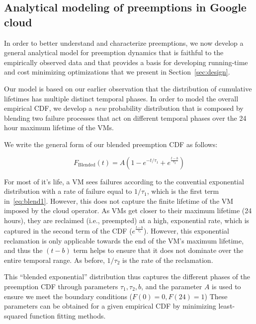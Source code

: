 \subsection{Analytical modeling of preemptions in Google cloud}

In order to better understand and characterize preemptions, we now develop a general analytical model for preemption dynamics that is faithful to the empirically observed data and that provides a basis for developing running-time and cost minimizing optimizations that we present in Section~\ref{sec:design}.


Our model is based on our earlier observation that the distribution of cumulative lifetimes has multiple distinct temporal phases.
In order to model the overall empirical CDF, we develop a \emph{new} probability distribution that is composed by blending two failure processes that act on different temporal phases over the 24 hour maximum lifetime of the VMs. 

We write the general form of our blended preemption CDF as follows:

\begin{equation}
  \label{eq:blend1}
  F_{\text{Blended}}(t) = A(1-e^{-t/\tau_1} + e^{\frac{t-b}{\tau_2}})
\end{equation}

For most of it's life, a VM sees failures according to the convential exponential distribution with a rate of failure equal to $1/\tau_1$, which is the first term in~\ref{eq:blend1}. 
However, this does not capture the finite lifetime of the VM imposed by the cloud operator.
As VMs get closer to their maximum lifetime (24 hours), they are reclaimed (i.e., preempted) at a high, exponential rate, which is captured in the second term of the CDF ($e^{\frac{t-b}{\tau_2}}$). 
However, this exponential reclamation is only applicable towards the end of the VM's maximum lifetime, and thus the $(t-b)$ term helps to ensure that it does not dominate over the entire temporal range.
As before, $1/\tau_2$ is the rate of the reclamation.

This ``blended exponential'' distribution thus captures the different phases of the preemption CDF through parameters $\tau_1, \tau_2, b$, and the parameter $A$ is used to ensure we meet the boundary conditions ($F(0)=0, F(24)=1$)
These parameters can be obtained for a given empirical CDF by minimizing least-squared function fitting methods. \footnotemark 



